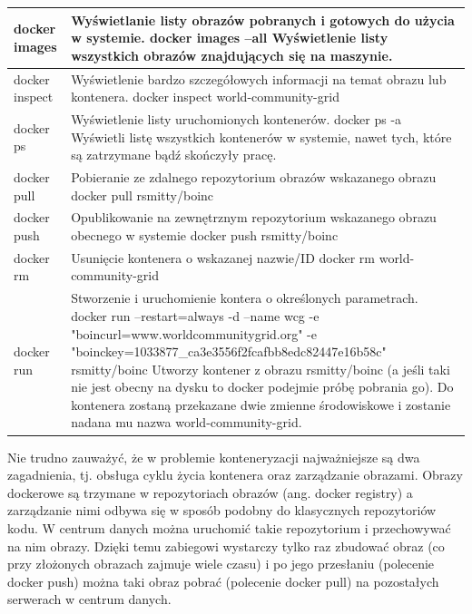 \documentclass[10pt,a4paper,titlepage,twoside]{report}
\begin{document}
\begin{table}[!htbp]
\begin{tabular}{|p{3cm}|p{11cm}|}
  \hline
  docker images & Wyświetlanie listy obrazów pobranych i gotowych do użycia w systemie. \newline docker images –all \newline Wyświetlenie listy wszystkich obrazów znajdujących się na maszynie. \\
  \hline docker inspect & Wyświetlenie bardzo szczegółowych informacji na temat obrazu lub kontenera. \newline docker inspect  world-community-grid \\
  \hline docker ps & Wyświetlenie listy uruchomionych kontenerów. \newline docker ps -a \newline Wyświetli listę wszystkich kontenerów w systemie, nawet tych, które są zatrzymane bądź skończyły pracę. \\
  \hline docker pull & Pobieranie ze zdalnego repozytorium obrazów wskazanego obrazu \newline docker pull rsmitty/boinc \\
  \hline docker push & Opublikowanie na zewnętrznym repozytorium wskazanego obrazu obecnego w systemie \newline docker push rsmitty/boinc \\
  \hline docker rm & Usunięcie kontenera o wskazanej nazwie/ID \newline docker rm  world-community-grid \\
  \hline docker run & Stworzenie i uruchomienie kontera o określonych parametrach. \newline \newline docker run --restart=always -d --name wcg -e "boincurl=www.worldcommunitygrid.org" -e "boinckey=1033877\_ca3e3556f2fcafbb8edc82447e16b58c" rsmitty/boinc \newline Utworzy kontener z obrazu rsmitty/boinc (a jeśli taki nie jest obecny na dysku to docker podejmie próbę pobrania go). Do kontenera zostaną przekazane dwie zmienne środowiskowe i zostanie nadana mu nazwa world-community-grid.  \\
  \hline
\end{tabular}
\end{table}

 Nie trudno zauważyć, że w problemie konteneryzacji najważniejsze są dwa zagadnienia, tj. obsługa cyklu życia kontenera oraz zarządzanie obrazami. Obrazy dockerowe są trzymane w repozytoriach obrazów (ang. docker registry) a zarządzanie nimi odbywa się w sposób podobny do klasycznych repozytoriów kodu. W centrum danych można uruchomić takie repozytorium i przechowywać na nim obrazy. Dzięki temu zabiegowi wystarczy tylko raz zbudować obraz (co przy złożonych obrazach zajmuje wiele czasu) i po jego przesłaniu (polecenie docker push) można taki obraz pobrać (polecenie docker pull) na pozostałych serwerach w centrum danych.
\end{document}
